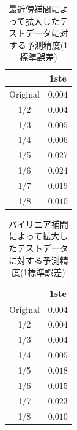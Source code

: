 \documentclass[a4j, 11pt]{jreport}
\begin{document}

\begin{table}[H]
  \centering
	\caption{最近傍補間によって拡大したテストデータに対する予測精度(1標準誤差)}
  \begin{tabular}{|c|c|}
		\hline
    & 1ste \\ \hline
    Original & $0.004$ \\ \hline
    1/2 & $0.004$ \\ \hline
    1/3 & $0.005$ \\ \hline
    1/4 & $0.006$ \\ \hline
    1/5 & $0.027$ \\ \hline
    1/6 & $0.024$ \\ \hline
    1/7 & $0.019$ \\ \hline
    1/8 & $0.010$ \\ \hline
  \end{tabular}
  \label{tb:accs_4_2_nearest_1ste}
\end{table}

\begin{table}[H]
  \centering
	\caption{バイリニア補間によって拡大したテストデータに対する予測精度(1標準誤差)}
  \begin{tabular}{|c|c|}
		\hline
    & 1ste \\ \hline
    Original & $0.004$ \\ \hline
    1/2 & $0.004$ \\ \hline
    1/3 & $0.004$ \\ \hline
    1/4 & $0.005$ \\ \hline
    1/5 & $0.018$ \\ \hline
    1/6 & $0.015$ \\ \hline
    1/7 & $0.023$ \\ \hline
    1/8 & $0.010$ \\ \hline
  \end{tabular}
  \label{tb:accs_4_2_linear_1ste}
\end{table}
\end{document}
